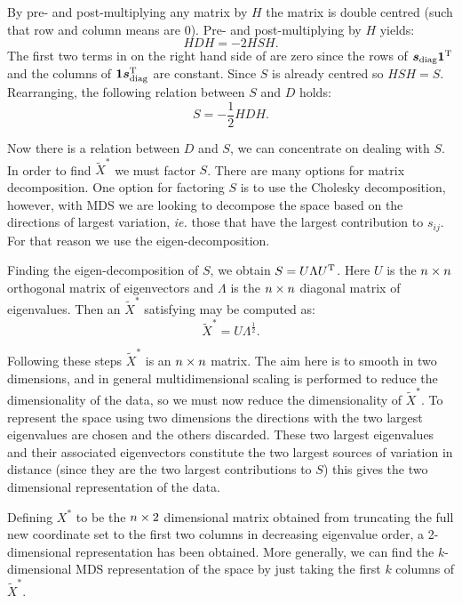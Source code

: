 By pre- and post-multiplying any matrix by $H$ the matrix is double centred (such that row and column means are 0). Pre- and post-multiplying  by $H$ yields:
\begin{equation}
HDH = -2HSH.
\end{equation}
The first two terms in on the right hand side of  are zero since the rows of $\bm{s}_\text{diag}\bm{1}^{\text{T}}$ and the columns of  $\bm{1}\bm{s}_\text{diag}^{\text{T}}$ are constant. Since $S$ is already centred so $HSH=S$. Rearranging, the following relation between $S$ and $D$ holds:
\begin{equation}
S = -\frac{1}{2}HDH.
\end{equation}

Now there is a relation between $D$ and $S$, we can concentrate on dealing with $S$. In order to find $\tilde{X}^{*}$ we must factor $S$. There are many options for matrix decomposition. One option for factoring $S$ is to use the Cholesky decomposition, however, with MDS we are looking to decompose the space based on the directions of largest variation, \emph{ie.} those that have the largest contribution to $s_{ij}$. For that reason we use the eigen-decomposition.

Finding the eigen-decomposition of $S$, we obtain $S=U\Lambda U^{\text{T}}$. Here $U$ is the $n \times n$ orthogonal matrix of eigenvectors and $\Lambda$ is the $n \times n$ diagonal matrix of eigenvalues. Then an $\tilde{X}^*$ satisfying  may be computed as:
\begin{equation}
\tilde{X}^*=U\Lambda^{\frac{1}{2}}.
\end{equation}

Following these steps $\tilde{X}^*$ is an $n \times n$ matrix. The aim here is to smooth in two dimensions, and in general multidimensional scaling is performed to reduce the dimensionality of the data, so we must now reduce the dimensionality of $\tilde{X}^*$. To represent the space using two dimensions the directions with the two largest eigenvalues are chosen and the others discarded. These two largest eigenvalues and their associated eigenvectors constitute the two largest sources of variation in distance (since they are the two largest contributions to $S$) this gives the two dimensional representation of the data. 

Defining $X^*$ to be the $n \times 2$ dimensional matrix obtained from truncating the full new coordinate set to the first two columns in decreasing eigenvalue order, a 2-dimensional representation has been obtained. More generally, we can find the $k$-dimensional MDS representation of the space by just taking the first $k$ columns of $\tilde{X}^*$.

